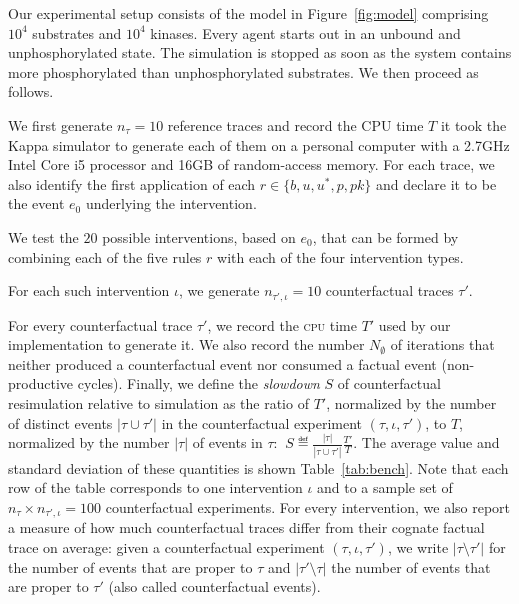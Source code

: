Our experimental setup consists of the model in Figure~\ref{fig:model} comprising $10^4$ substrates and $10^4$ kinases. Every agent starts out in an unbound and unphosphorylated state. The simulation is stopped as soon as the system contains more phosphorylated than unphosphorylated substrates. We then proceed as follows.
\begin{inparaenum}[(i)]
\item We first generate $n_{\tau}=10$ reference traces and record the
  CPU time $T$ it took the Kappa simulator to generate each of them on
  a personal computer with a 2.7GHz Intel Core i5 processor and 16GB
  of random-access memory.  For each trace, we also identify the first
  application of each $r\in\{b,u,u^{\ast},p,pk\}$ and declare it to be
  the event $e_0$ underlying the intervention.
\item We test the $20$ possible interventions, based on $e_0$, that
  can be formed by combining each of the five rules $r$ with each of
  the four intervention types.
\item For each such intervention $\iota$, we generate
  $n_{\tau',\iota} = 10$ counterfactual traces $\tau'$.
\item For every counterfactual trace $\tau'$, we record the
  \textsc{cpu} time $T'$ used by our implementation to generate it. We
  also record the number $N_{\emptyset}$ of iterations that neither
  produced a counterfactual event nor consumed a factual event
  (non-productive cycles).  Finally, we define the \textit{slowdown}
  $S$ of counterfactual resimulation relative to simulation as the
  ratio of $T'$, normalized by the number of distinct events
  $|\tau \cup \tau'|$ in the counterfactual experiment
  $(\tau, \iota, \tau')$, to $T$, normalized by the number $|\tau|$ of
  events in $\tau$:
  $\ S \eqdef \frac{|\tau|}{|\tau \cup \tau'|}\frac{T'}{T}.$
  The average value and standard deviation of these quantities is
  shown Table~\ref{tab:bench}. Note that each row of the table
  corresponds to one intervention $\iota$ and to a sample set of
  $n_{\tau} \times n_{\tau',\iota} = 100$ counterfactual
  experiments. For every intervention, we also report a measure of how
  much counterfactual traces differ from their cognate factual trace
  on average: given a counterfactual experiment
  $(\tau, \iota, \tau')$, we write $|\tau \!\setminus\! \tau'|$ for
  the number of events that are proper to $\tau$ and
  $|\tau' \!\setminus\! \tau|$ the number of events that are proper to
  $\tau'$ (also called counterfactual events).
\end{inparaenum}

